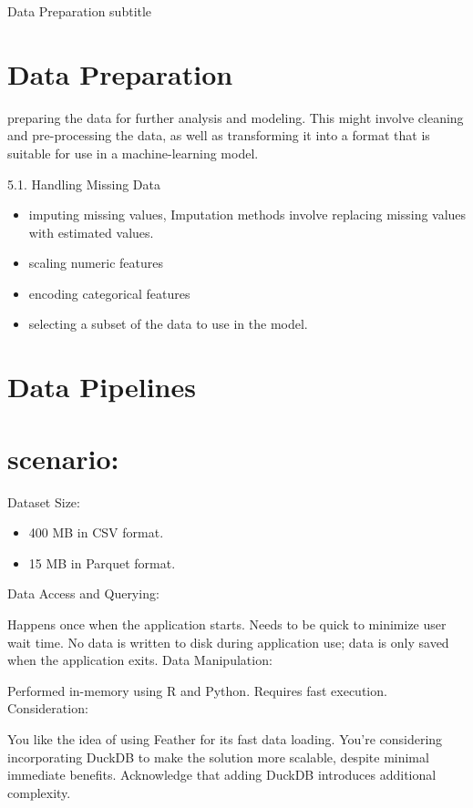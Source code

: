\documentclass[
  american,
  10,
  a4paper,
]{book}
\providecommand{\tightlist}{%
  \setlength{\itemsep}{0pt}\setlength{\parskip}{0pt}}
\theoremstyle{definition}
\theoremstyle{remark}
\begin{document}
Data Preparation subtitle

\hfill\break

\chapter{Data Preparation}\label{data-preparation-2}

preparing the data for further analysis and modeling. This might involve
cleaning and pre-processing the data, as well as transforming it into a
format that is suitable for use in a machine-learning model.

5.1. Handling Missing Data

\begin{itemize}
\item
  imputing missing values, Imputation methods involve replacing missing
  values with estimated values.
\item
  scaling numeric features
\item
  encoding categorical features
\item
  selecting a subset of the data to use in the model.
\end{itemize}

\chapter{Data Pipelines}\label{data-pipelines}

\chapter{scenario:}\label{scenario}

Dataset Size:

\begin{itemize}
\tightlist
\item
  400 MB in CSV format.
\item
  15 MB in Parquet format.
\end{itemize}

Data Access and Querying:

Happens once when the application starts. Needs to be quick to minimize
user wait time. No data is written to disk during application use; data
is only saved when the application exits. Data Manipulation:

Performed in-memory using R and Python. Requires fast execution.
Consideration:

You like the idea of using Feather for its fast data loading. You're
considering incorporating DuckDB to make the solution more scalable,
despite minimal immediate benefits. Acknowledge that adding DuckDB
introduces additional complexity.
\end{document}
